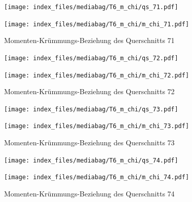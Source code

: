 \documentclass[
  11pt,
  letterpaper,
]{scrreprt}
\begin{document}
\begin{figure}[H]

\begin{minipage}{0.50\linewidth}
\texttt{[image: index\_files/mediabag/T6\_m\_chi/qs\_71.pdf]}\end{minipage}%
%
\begin{minipage}{0.50\linewidth}
\texttt{[image: index\_files/mediabag/T6\_m\_chi/m\_chi\_71.pdf]}\end{minipage}%

\caption{\label{fig-m_chi_appendix}Momenten-Krümmungs-Beziehung des
Querschnitts 71}

\end{figure}%

\begin{figure}[H]

\begin{minipage}{0.50\linewidth}
\texttt{[image: index\_files/mediabag/T6\_m\_chi/qs\_72.pdf]}\end{minipage}%
%
\begin{minipage}{0.50\linewidth}
\texttt{[image: index\_files/mediabag/T6\_m\_chi/m\_chi\_72.pdf]}\end{minipage}%

\caption{\label{fig-m_chi_appendix}Momenten-Krümmungs-Beziehung des
Querschnitts 72}

\end{figure}%

\begin{figure}[H]

\begin{minipage}{0.50\linewidth}
\texttt{[image: index\_files/mediabag/T6\_m\_chi/qs\_73.pdf]}\end{minipage}%
%
\begin{minipage}{0.50\linewidth}
\texttt{[image: index\_files/mediabag/T6\_m\_chi/m\_chi\_73.pdf]}\end{minipage}%

\caption{\label{fig-m_chi_appendix}Momenten-Krümmungs-Beziehung des
Querschnitts 73}

\end{figure}%

\begin{figure}[H]

\begin{minipage}{0.50\linewidth}
\texttt{[image: index\_files/mediabag/T6\_m\_chi/qs\_74.pdf]}\end{minipage}%
%
\begin{minipage}{0.50\linewidth}
\texttt{[image: index\_files/mediabag/T6\_m\_chi/m\_chi\_74.pdf]}\end{minipage}%

\caption{\label{fig-m_chi_appendix}Momenten-Krümmungs-Beziehung des
Querschnitts 74}

\end{figure}%
\end{document}
